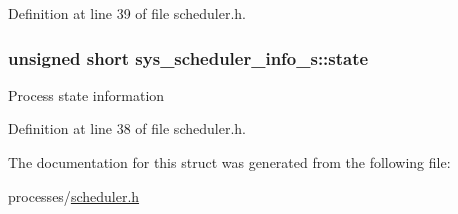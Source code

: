 Definition at line 39 of file scheduler.\+h.

\hypertarget{structsys__scheduler__info__s_a95d0294a71162ffbd1e65fd381e54a6b}{}
\subsubsection[{state}]{\setlength{\rightskip}{0pt plus 5cm}unsigned short sys\+\_\+scheduler\+\_\+info\+\_\+s\+::state}\label{structsys__scheduler__info__s_a95d0294a71162ffbd1e65fd381e54a6b}
Process state information 

Definition at line 38 of file scheduler.\+h.



The documentation for this struct was generated from the following file\+:\begin{DoxyCompactItemize}
\item 
processes/\hyperlink{scheduler_8h}{scheduler.\+h}\end{DoxyCompactItemize}
